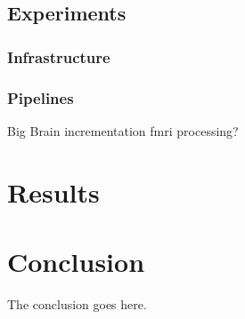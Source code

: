 \documentclass[10pt,journal,compsoc]{IEEEtran}
\begin{document}
\subsection{Experiments}
\subsubsection{Infrastructure}
\subsubsection{Pipelines}
Big Brain incrementation
fmri processing?

\section{Results}


\section{Conclusion}
The conclusion goes here.






%


\appendices
\end{document}
